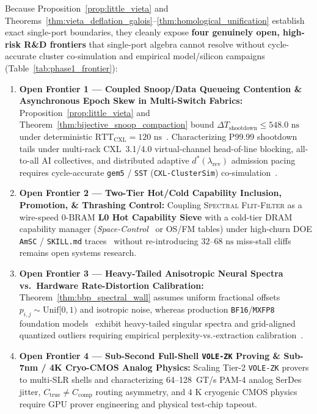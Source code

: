 \documentclass[10pt,twocolumn]{article}
\theoremstyle{spectralthm}
\begin{document}
Because Proposition~\ref{prop:little_vieta} and Theorems~\ref{thm:vieta_deflation_galois}--\ref{thm:homological_unification} establish exact single-port boundaries, they cleanly expose \textbf{four genuinely open, high-risk R\&D frontiers} that single-port algebra cannot resolve without cycle-accurate cluster co-simulation and empirical model/silicon campaigns (Table~\ref{tab:phase1_frontier}):
\begin{enumerate}
  \item \textbf{Open Frontier 1 --- Coupled Snoop/Data Queueing Contention \& Asynchronous Epoch Skew in Multi-Switch Fabrics:} Proposition~\ref{prop:little_vieta} and Theorem~\ref{thm:bijective_snoop_compaction} bound $\Delta T_{\mathrm{shootdown}} \le 548.0\text{~ns}$ under deterministic $\mathrm{RTT}_{\mathrm{CXL}} = 120\text{~ns}$~\cite{sun2023demystifying}. Characterizing P99.99 shootdown tails under multi-rack CXL~3.1/4.0 virtual-channel head-of-line blocking, all-to-all AI collectives, and distributed adaptive $d^*(\lambda_{\mathrm{rev}})$ admission pacing requires cycle-accurate \texttt{gem5} / \texttt{SST} (\texttt{CXL-ClusterSim}) co-simulation~\cite{poloczek2014martingale}.
  \item \textbf{Open Frontier 2 --- Two-Tier Hot/Cold Capability Inclusion, Promotion, \& Thrashing Control:} Coupling \textsc{Spectral Flit-Filter} as a wire-speed $0\text{-BRAM}$ \textbf{L0 Hot Capability Sieve} with a cold-tier DRAM capability manager (\textit{Space-Control}~\cite{goswami2026spacecontrol} or OS/FM tables) under high-churn DOE \texttt{AmSC} / \texttt{SKILL.md} traces~\cite{doe2025genesis} without re-introducing $32$--$68\text{~ns}$ miss-stall cliffs remains open systems research.
  \item \textbf{Open Frontier 3 --- Heavy-Tailed Anisotropic Neural Spectra vs.\ Hardware Rate-Distortion Calibration:} Theorem~\ref{thm:bbp_spectral_wall} assumes uniform fractional offsets $p_{i,j} \sim \mathrm{Unif}[0,1)$ and isotropic noise, whereas production \texttt{BF16}/\texttt{MXFP8} foundation models~\cite{rouhani2023microscaling,hu2022lora} exhibit heavy-tailed singular spectra and grid-aligned quantized outliers requiring empirical perplexity-vs.-extraction calibration~\cite{carlini2024stealing}.
  \item \textbf{Open Frontier 4 --- Sub-Second Full-Shell \texttt{VOLE-ZK} Proving \& Sub-7nm / 4K Cryo-CMOS Analog Physics:} Scaling Tier-2 \texttt{VOLE-ZK} provers to multi-SLR shells and characterizing 64--128~GT/s PAM-4 analog SerDes jitter, $C_{\mathrm{true}} \neq C_{\mathrm{comp}}$ routing asymmetry, and $4\text{~K}$ cryogenic CMOS physics require GPU prover engineering and physical test-chip tapeout.
\end{enumerate}
\end{document}
